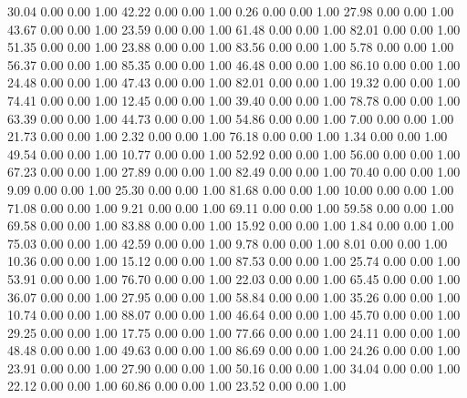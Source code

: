    30.04   0.00   0.00   1.00
   42.22   0.00   0.00   1.00
    0.26   0.00   0.00   1.00
   27.98   0.00   0.00   1.00
   43.67   0.00   0.00   1.00
   23.59   0.00   0.00   1.00
   61.48   0.00   0.00   1.00
   82.01   0.00   0.00   1.00
   51.35   0.00   0.00   1.00
   23.88   0.00   0.00   1.00
   83.56   0.00   0.00   1.00
    5.78   0.00   0.00   1.00
   56.37   0.00   0.00   1.00
   85.35   0.00   0.00   1.00
   46.48   0.00   0.00   1.00
   86.10   0.00   0.00   1.00
   24.48   0.00   0.00   1.00
   47.43   0.00   0.00   1.00
   82.01   0.00   0.00   1.00
   19.32   0.00   0.00   1.00
   74.41   0.00   0.00   1.00
   12.45   0.00   0.00   1.00
   39.40   0.00   0.00   1.00
   78.78   0.00   0.00   1.00
   63.39   0.00   0.00   1.00
   44.73   0.00   0.00   1.00
   54.86   0.00   0.00   1.00
    7.00   0.00   0.00   1.00
   21.73   0.00   0.00   1.00
    2.32   0.00   0.00   1.00
   76.18   0.00   0.00   1.00
    1.34   0.00   0.00   1.00
   49.54   0.00   0.00   1.00
   10.77   0.00   0.00   1.00
   52.92   0.00   0.00   1.00
   56.00   0.00   0.00   1.00
   67.23   0.00   0.00   1.00
   27.89   0.00   0.00   1.00
   82.49   0.00   0.00   1.00
   70.40   0.00   0.00   1.00
    9.09   0.00   0.00   1.00
   25.30   0.00   0.00   1.00
   81.68   0.00   0.00   1.00
   10.00   0.00   0.00   1.00
   71.08   0.00   0.00   1.00
    9.21   0.00   0.00   1.00
   69.11   0.00   0.00   1.00
   59.58   0.00   0.00   1.00
   69.58   0.00   0.00   1.00
   83.88   0.00   0.00   1.00
   15.92   0.00   0.00   1.00
    1.84   0.00   0.00   1.00
   75.03   0.00   0.00   1.00
   42.59   0.00   0.00   1.00
    9.78   0.00   0.00   1.00
    8.01   0.00   0.00   1.00
   10.36   0.00   0.00   1.00
   15.12   0.00   0.00   1.00
   87.53   0.00   0.00   1.00
   25.74   0.00   0.00   1.00
   53.91   0.00   0.00   1.00
   76.70   0.00   0.00   1.00
   22.03   0.00   0.00   1.00
   65.45   0.00   0.00   1.00
   36.07   0.00   0.00   1.00
   27.95   0.00   0.00   1.00
   58.84   0.00   0.00   1.00
   35.26   0.00   0.00   1.00
   10.74   0.00   0.00   1.00
   88.07   0.00   0.00   1.00
   46.64   0.00   0.00   1.00
   45.70   0.00   0.00   1.00
   29.25   0.00   0.00   1.00
   17.75   0.00   0.00   1.00
   77.66   0.00   0.00   1.00
   24.11   0.00   0.00   1.00
   48.48   0.00   0.00   1.00
   49.63   0.00   0.00   1.00
   86.69   0.00   0.00   1.00
   24.26   0.00   0.00   1.00
   23.91   0.00   0.00   1.00
   27.90   0.00   0.00   1.00
   50.16   0.00   0.00   1.00
   34.04   0.00   0.00   1.00
   22.12   0.00   0.00   1.00
   60.86   0.00   0.00   1.00
   23.52   0.00   0.00   1.00
